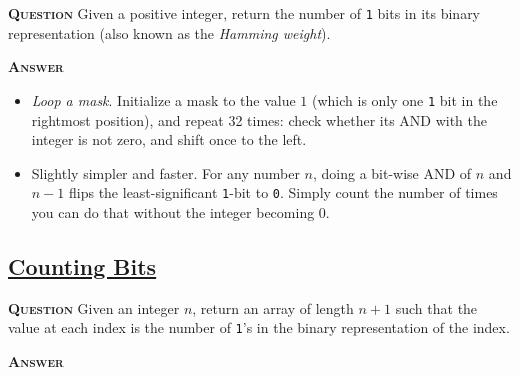 \documentclass[table, xcdraw]{article}%
\begin{document}
\textsc{\textbf{Question}} Given a positive integer, return the number of \texttt{1} bits in its binary representation (also known as the \textit{Hamming weight}).

\textsc{\textbf{Answer}}

\begin{itemize}
    \item \textit{Loop a mask}. Initialize a mask to the value $1$ (which is only one \texttt{1} bit in the rightmost position), and repeat 32 times: check whether its AND with the integer is not zero, and shift once to the left.
    \item Slightly simpler and faster. For any number $n$, doing a bit-wise AND of $n$ and $n-1$ flips the least-significant \texttt{1}-bit to \texttt{0}. Simply count the number of times you can do that without the integer becoming $0$.
\end{itemize}

\subsection{\href{https://leetcode.com/problems/counting-bits}{Counting Bits}}

\textsc{\textbf{Question}} Given an integer $n$, return an array of length $n + 1$ such that the value at each index is the number of \texttt{1}'s in the binary representation of the index.

\textsc{\textbf{Answer}}

\end{document}
